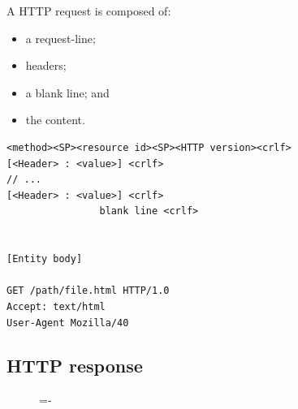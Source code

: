 \documentclass[a4paper]{systems-software}
\begin{document}
A HTTP request is composed of:
\begin{itemize}
	\item a request-line;
	\item headers;
	\item a blank line; and
	\item the content.
\end{itemize}

\begin{lstlisting}[title={Example HTTP request.}]
<method><SP><resource id><SP><HTTP version><crlf>
[<Header> : <value>] <crlf>
// ...
[<Header> : <value>] <crlf>
				blank line <crlf>
				
				
[Entity body]

GET /path/file.html HTTP/1.0
Accept: text/html
User-Agent Mozilla/40
\end{lstlisting}


\subsection*{HTTP response}

\begin{figure}[H]
	\lineskip=-\fboxrule
\end{figure}
\end{document}
